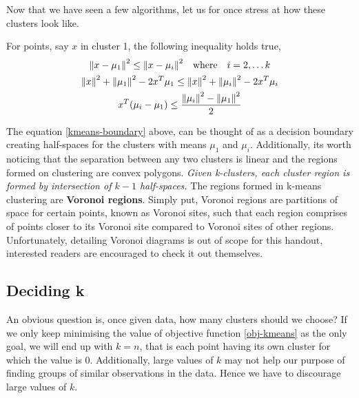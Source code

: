 \documentclass[12pt,a4paper]{article}
\begin{document}
Now that we have seen a few algorithms, let us for once stress at how these clusters look like.

For points, say $x$ in cluster 1, the following inequality holds true,
\begin{gather}
    \norm{x- \mu_1}^2 \leq \norm{x-\mu_i}^2 \quad \text{where} \quad i=2, \dots k \nonumber\\
    \norm{x}^2 + \norm{\mu_1}^2 - 2x^T\mu_1 \leq \norm{x}^2 + \norm{\mu_i}^2 - 2x^T\mu_i \nonumber \\
    x^T(\mu_i-\mu_1) \leq \dfrac{\norm{\mu_i}^2 - \norm{\mu_1}^2}{2} \label{kmeans-boundary}
\end{gather}

The equation \eqref{kmeans-boundary} above, can be thought of as a decision boundary creating half-spaces for the clusters with means $\mu_1$ and $\mu_i$.  Additionally, its worth noticing that the separation between any two clusters is linear and the regions formed on clustering are convex polygons. \textit{Given k-clusters, each cluster region is formed by intersection of $k-1$ half-spaces.} The regions formed in k-means clustering are \textbf{Voronoi regions}. Simply put, Voronoi regions are partitions of space for certain points, known as Voronoi sites, such that each region comprises of points closer to its Voronoi site compared to Voronoi sites of other regions. Unfortunately, detailing Voronoi diagrams is out of scope for this handout, interested readers are encouraged to check it out themselves.

\subsection{Deciding k}
An obvious question is, once given data, how many clusters should we choose? If we only keep minimising the value of objective function \eqref{obj-kmeans} as the only goal, we will end up with $k=n$, that is each point having its own cluster for which the value is 0. Additionally, large values of $k$ may not help our purpose of finding  groups of similar observations in the data. Hence we have to discourage large values of $k$.
\end{document}
